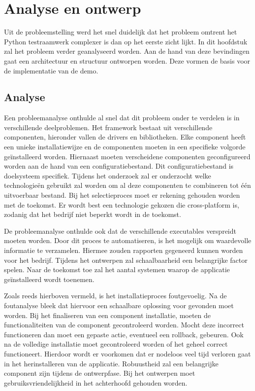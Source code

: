 \chapter{Analyse en ontwerp}
Uit de probleemstelling werd het snel duidelijk dat het probleem omtrent het Python testraamwerk complexer is dan op het eerste zicht lijkt.
In dit hoofdstuk zal het probleem verder geanalyseerd worden.
Aan de hand van deze bevindingen gaat een architectuur en structuur ontworpen worden.
Deze vormen de basis voor de implementatie van de demo.

\section{Analyse}
Een probleemanalyse onthulde al snel dat dit probleem onder te verdelen is in verschillende deelproblemen.
Het framework bestaat uit verschillende componenten, hieronder vallen de drivers en bibliotheken.
Elke component heeft een unieke installatiewijze en de componenten moeten in een specifieke volgorde geïnstalleerd worden.
Hiernaast moeten verscheidene componenten geconfigureerd worden aan de hand van een configuratiebestand.
Dit configuratiebestand is doelsysteem specifiek.
Tijdens het onderzoek zal er onderzocht welke technologieën gebruikt zal worden om al deze componenten te combineren tot één uitvoerbaar bestand.
Bij het selectieproces moet er rekening gehouden worden met de toekomst.
Er wordt best een technologie gekozen die cross-platform is, zodanig dat het bedrijf niet beperkt wordt in de toekomst.

De probleemanalyse onthulde ook dat de verschillende executables verspreidt moeten worden.
Door dit proces te automatiseren, is het mogelijk om waardevolle informatie te verzamelen.
Hiermee zouden rapporten gegeneerd kunnen worden voor het bedrijf.
Tijdens het ontwerpen zal schaalbaarheid een belangrijke factor spelen.
Naar de toekomst toe zal het aantal systemen waarop de applicatie geïnstalleerd wordt toenemen.

Zoals reeds hierboven vermeld, is het installatieproces foutgevoelig.
Na de foutanalyse bleek dat hiervoor een schaalbare oplossing voor gevonden moet worden.
Bij het finaliseren van een component installatie, moeten de functionaliteiten van de component gecontroleerd worden.
Mocht deze incorrect functioneren dan moet een gepaste actie, eventueel een rollback, gebeuren. 
Ook na de volledige installatie moet gecontroleerd worden of het geheel correct functioneert.
Hierdoor wordt er voorkomen dat er nodeloos veel tijd verloren gaat in het herinstalleren van de applicatie.
Robuustheid zal een belangrijke component zijn tijdens de ontwerpfase.
Bij het ontwerpen moet gebruiksvriendelijkheid in het achterhoofd gehouden worden.


